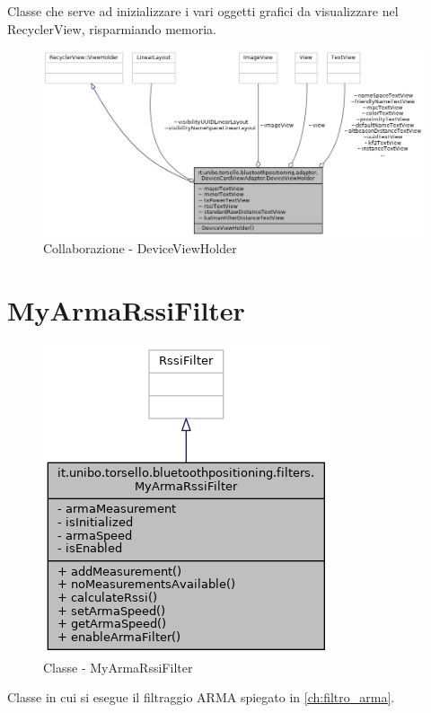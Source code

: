 Classe che serve ad inizializzare i vari oggetti grafici da visualizzare nel RecyclerView, risparmiando memoria.

\begin{figure}[ph]
	\centering
	\includegraphics[width=1.5\linewidth,angle=90]{img/uml/class/classit_1_1unibo_1_1torsello_1_1bluetoothpositioning_1_1adapter_1_1DeviceCardViewAdapter_1_1DeviceViewHolder__coll__graph.png}
	\caption{Collaborazione - DeviceViewHolder}
\end{figure}

\newpage
\section{MyArmaRssiFilter}
\begin{figure}[ph]
	\centering
	\includegraphics[width=0.5\linewidth]{img/uml/class/classit_1_1unibo_1_1torsello_1_1bluetoothpositioning_1_1filters_1_1MyArmaRssiFilter__inherit__graph.png}
	\caption{Classe - MyArmaRssiFilter}
\end{figure}

Classe in cui si esegue il filtraggio ARMA spiegato in \ref{ch:filtro_arma}.

